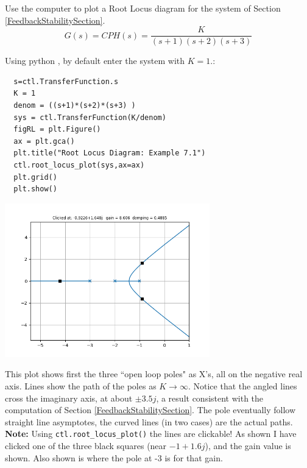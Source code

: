 \begin{ExampleSmall}
Use the computer to plot a Root Locus diagram for the system of Section \ref{FeedbackStabilitySection}.
\[
G(s)= CPH(s) = \frac{K}{(s+1)(s+2)(s+3)}
\]


Using python , by default enter the system with $K=1$.:

\begin{verbatim}
  s=ctl.TransferFunction.s
  K = 1
  denom = ((s+1)*(s+2)*(s+3) )
  sys = ctl.TransferFunction(K/denom)
  figRL = plt.Figure()
  ax = plt.gca()
  plt.title("Root Locus Diagram: Example 7.1")
  ctl.root_locus_plot(sys,ax=ax)
  plt.grid()
  plt.show()
\end{verbatim}

\includegraphics[width=3.5in]{figs07/B47H33.png}

This plot shows first the three ``open loop poles" as X's, all on the negative
real axis.  Lines show the path of the poles as $K\to\infty$. Notice that the
angled lines cross the imaginary axis, at about $\pm3.5j$,
a result consistent with the computation of Section \ref{FeedbackStabilitySection}.
The pole eventually follow straight line asymptotes,
the curved lines (in two cases) are the actual paths. {\bf Note: }
Using {\tt ctl.root_locus_plot()} the lines are clickable!  As shown
I have clicked one of the three black squares  (near $-1+1.6j$),
and the gain value is shown.   Also shown is where the pole at -3 is
for that gain.
\end{ExampleSmall}
\vspace{0.75in}


